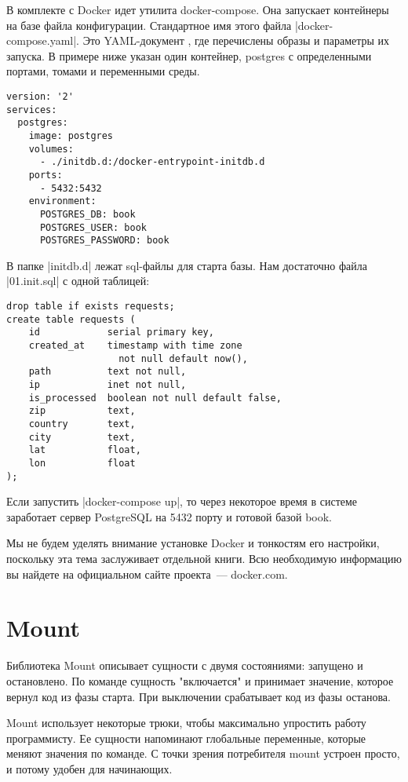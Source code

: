 В комплекте с Docker идет утилита docker-compose. Она запускает контейнеры на
базе файла конфигурации. Стандартное имя этого файла \spverb|docker-compose.yaml|. Это
YAML-документ , где перечислены образы и параметры их запуска. В примере ниже
указан один контейнер, postgres с определенными портами, томами и переменными
среды.

\begin{verbatim}
version: '2'
services:
  postgres:
    image: postgres
    volumes:
      - ./initdb.d:/docker-entrypoint-initdb.d
    ports:
      - 5432:5432
    environment:
      POSTGRES_DB: book
      POSTGRES_USER: book
      POSTGRES_PASSWORD: book
\end{verbatim}

В папке \spverb|initdb.d| лежат sql-файлы для старта базы. Нам достаточно файла
\spverb|01.init.sql| с одной таблицей:

\begin{verbatim}
drop table if exists requests;
create table requests (
    id            serial primary key,
    created_at    timestamp with time zone
                    not null default now(),
    path          text not null,
    ip            inet not null,
    is_processed  boolean not null default false,
    zip           text,
    country       text,
    city          text,
    lat           float,
    lon           float
);
\end{verbatim}

Если запустить \spverb|docker-compose up|, то через некоторое время в системе
заработает сервер PostgreSQL на 5432 порту и готовой базой book.

Мы не будем уделять внимание установке Docker и тонкостям его настройки,
поскольку эта тема заслуживает отдельной книги. Всю необходимую информацию вы
найдете на официальном сайте проекта~--- docker.com.

\section{Mount}

Библиотека Mount описывает сущности с двумя
состояниями: запущено и остановлено. По команде сущность "включается" и
принимает значение, которое вернул код из фазы старта. При выключении
срабатывает код из фазы останова.

Mount использует некоторые трюки, чтобы максимально упростить работу
программисту. Ее сущности напоминают глобальные переменные, которые меняют
значения по команде. С точки зрения потребителя mount устроен просто, и потому
удобен для начинающих.

